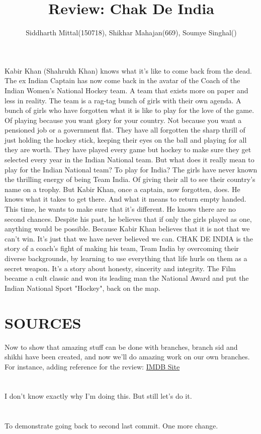 \documentclass[titlepage]{article}
\title{Review: Chak De India}
\author{Siddharth Mittal(150718), Shikhar Mahajan(669), Soumye Singhal()}
\begin{document}
\maketitle

\section*{}
Kabir Khan (Shahrukh Khan) knows what it's like to come back from the dead. The ex Indian Captain has now come back in the avatar of the Coach of the Indian Women's National Hockey team. A team that exists more on paper and less in reality. The team is a rag-tag bunch of girls with their own agenda. A bunch of girls who have forgotten what it is like to play for the love of the game. Of playing because you want glory for your country. Not because you want a pensioned job or a government flat. They have all forgotten the sharp thrill of just holding the hockey stick, keeping their eyes on the ball and playing for all they are worth. They have played every game but hockey to make sure they get selected every year in the Indian National team. But what does it really mean to play for the Indian National team? To play for India? The girls have never known the thrilling energy of being Team India. Of giving their all to see their country's name on a trophy. But Kabir Khan, once a captain, now forgotten, does. He knows what it takes to get there. And what it means to return empty handed. This time, he wants to make sure that it's different. He knows there are no second chances. Despite his past, he believes that if only the girls played as one, anything would be possible. Because Kabir Khan believes that it is not that we can't win. It's just that we have never believed we can. CHAK DE INDIA is the story of a coach's fight of making his team, Team India by overcoming their diverse backgrounds, by learning to use everything that life hurls on them as a secret weapon. It's a story about honesty, sincerity and integrity. The Film became a cult classic and won its leading man the National Award and put the Indian National Sport "Hockey", back on the map.

\section*{SOURCES}
Now to show that amazing stuff can be done with branches, branch sid and shikhi have been created, and now we'll do amazing work on our own branches.
For instance, adding reference for the review: \href{http://www.imdb.com/title/tt0871510/plotsummary}{IMDB Site}

\section*{}
I don't know exactly why I'm doing this. But still let's do it.
\section*{}
To demonstrate going back to second last commit. One more change.
\end{document}
